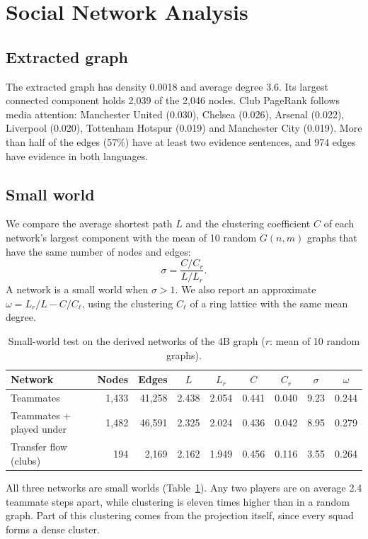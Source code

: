 \documentclass[11pt]{article}
\begin{document}
\section{Social Network Analysis}
\subsection{Extracted graph}
The extracted graph has density 0.0018 and average degree 3.6. Its largest connected component holds 2,039 of the 2,046 nodes. Club PageRank follows media attention: Manchester United (0.030), Chelsea (0.026), Arsenal (0.022), Liverpool (0.020), Tottenham Hotspur (0.019) and Manchester City (0.019). More than half of the edges (57\%) have at least two evidence sentences, and 974 edges have evidence in both languages.

\subsection{Small world}
We compare the average shortest path $L$ and the clustering coefficient $C$ of each network's largest component with the mean of 10 random $G(n,m)$ graphs that have the same number of nodes and edges:
\[\sigma = \frac{C/C_{r}}{L/L_{r}}.\]
A network is a small world when $\sigma > 1$. We also report an approximate $\omega = L_r/L - C/C_\ell$, using the clustering $C_\ell$ of a ring lattice with the same mean degree.

\begin{table}[t]\centering\small
\caption{Small-world test on the derived networks of the 4B graph ($r$: mean of 10 random graphs).}
\label{tab:smallworld}
\begin{tabular}{@{}lrrcccccc@{}}\toprule
Network & Nodes & Edges & $L$ & $L_r$ & $C$ & $C_r$ & $\sigma$ & $\omega$\\\midrule
Teammates & 1,433 & 41,258 & 2.438 & 2.054 & 0.441 & 0.040 & 9.23 & 0.244\\
Teammates + played under & 1,482 & 46,591 & 2.325 & 2.024 & 0.436 & 0.042 & 8.95 & 0.279\\
Transfer flow (clubs) & 194 & 2,169 & 2.162 & 1.949 & 0.456 & 0.116 & 3.55 & 0.264\\\bottomrule
\end{tabular}
\end{table}

All three networks are small worlds (Table~\ref{tab:smallworld}). Any two players are on average 2.4 teammate steps apart, while clustering is eleven times higher than in a random graph. Part of this clustering comes from the projection itself, since every squad forms a dense cluster.
\end{document}
